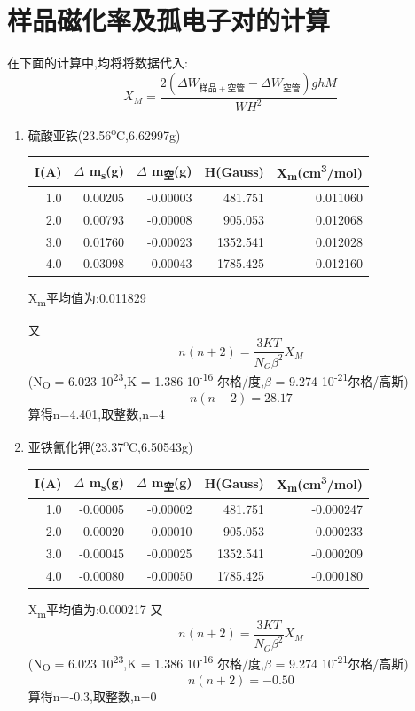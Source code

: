 \documentclass[11pt]{report}
\begin{document}
\section{样品磁化率及孤电子对的计算}
\label{sec:org1878ff8}
在下面的计算中,均将将数据代入:
\[
    X_{M}=\frac{2(\Delta W_{样品+空管}-\Delta W_{空管})ghM}{WH^{2}}
    \]
\begin{enumerate}
\item 硫酸亚铁(23.56\textsuperscript{o}C,6.62997g)
\label{sec:orgd67e785}
\begin{center}
\begin{tabular}{rrrrr}
I(A) & \(\Delta\) m\textsubscript{s}(g) & \(\Delta\) m\textsubscript{空}(g) & H(Gauss) & X\textsubscript{m}(cm\textsuperscript{3}/mol)\\
\hline
1.0 & 0.00205 & -0.00003 & 481.751 & 0.011060\\
2.0 & 0.00793 & -0.00008 & 905.053 & 0.012068\\
3.0 & 0.01760 & -0.00023 & 1352.541 & 0.012028\\
4.0 & 0.03098 & -0.00043 & 1785.425 & 0.012160\\
\end{tabular}
\end{center}
X\textsubscript{m}平均值为:0.011829

又
\[
n(n+2)=\frac{3KT}{N_{O}\beta^{2}}X_{M}
\]
(N\textsubscript{O} = 6.023\texttimes{} 10\textsuperscript{23},K = 1.386\texttimes{} 10\textsuperscript{-16} 尔格/度,\(\beta\) = 9.274\texttimes{} 10\textsuperscript{-21}尔格/高斯)
\[
n(n+2)=28.17
\]
算得n=4.401,取整数,n=4

\item 亚铁氰化钾(23.37\textsuperscript{o}C,6.50543g)
\label{sec:org9ab075a}
\begin{center}
\begin{tabular}{rrrrr}
I(A) & \(\Delta\) m\textsubscript{s}(g) & \(\Delta\) m\textsubscript{空}(g) & H(Gauss) & X\textsubscript{m}(cm\textsuperscript{3}/mol)\\
\hline
1.0 & -0.00005 & -0.00002 & 481.751 & -0.000247\\
2.0 & -0.00020 & -0.00010 & 905.053 & -0.000233\\
3.0 & -0.00045 & -0.00025 & 1352.541 & -0.000209\\
4.0 & -0.00080 & -0.00050 & 1785.425 & -0.000180\\
\end{tabular}
\end{center}
X\textsubscript{m}平均值为:0.000217
又
\[
n(n+2)=\frac{3KT}{N_{O}\beta^{2}}X_{M}
\]
(N\textsubscript{O} = 6.023\texttimes{} 10\textsuperscript{23},K = 1.386\texttimes{} 10\textsuperscript{-16} 尔格/度,\(\beta\) = 9.274\texttimes{} 10\textsuperscript{-21}尔格/高斯)
\[
n(n+2)=-0.50
\]
算得n=-0.3,取整数,n=0
\end{enumerate}
\end{document}
